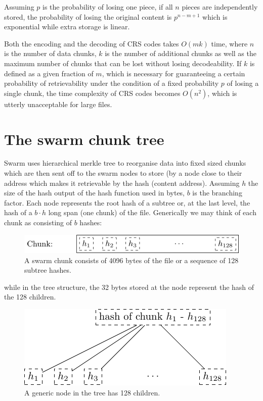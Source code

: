 \documentclass[12pt]{article}
\begin{document}
Assuming $p$ is the probability of losing one piece, if all $n$ pieces are independently stored, the probability of losing the original content is $p^{n-m+1}$ which is exponential while extra storage is linear.

Both the encoding and the decoding of CRS codes takes $O(mk)$ time, where $n$ is the number of data chunks, $k$ is the number of additional chunks as well as the maximum number of chunks that can be lost without losing decodeability. If $k$ is defined as a given fraction of $m$, which is necessary for guaranteeing a certain probability of retrievability under the condition of a fixed probability $p$ of losing a single chunk, the time complexity of CRS codes becomes $O(n^2)$, which is utterly unacceptable for large files.

\section{The swarm chunk tree}

Swarm uses hierarchical merkle tree \cite{merkle1980protocols} to reorganise data into fixed sized chunks which are then sent off to the swarm nodes to store (by a node close to their address which makes it retrievable by the hash (content address).
Assuming $h$ the size of the hash output of the hash function used in bytes, $b$ is the branching factor. Each node represents the root hash of a subtree or, at the last level, the hash of a $b\cdot h$ long span (one chunk) of the file. Generically we may think of each chunk as consisting of $b$ hashes:


\begin{figure}[htbp]
   \centering
   \includegraphics{fig/chunk.pdf} %
   \caption{A swarm chunk consists of 4096 bytes of the file or a sequence of 128 subtree hashes.}
   \label{fig:chunk}
\end{figure}

while in the tree structure, the 32 bytes stored at the node represent the hash of the 128 children.

\begin{figure}[htbp]
   \centering
   \includegraphics{fig/treebasic.pdf} %
   \caption{ A generic node in the tree has 128 children.}
   \label{fig:treebasic}
\end{figure}
\end{document}
